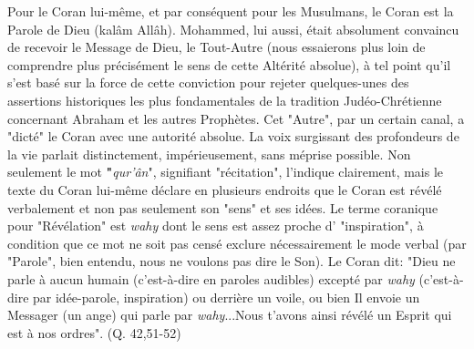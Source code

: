  
Pour le Coran lui-même, et par conséquent pour les Musulmans, le Coran
est la Parole de Dieu (kalâm Allâh). Mohammed, lui aussi, était
absolument convaincu de recevoir le Message de Dieu, le Tout-Autre (nous
essaierons plus loin de comprendre plus précisément le sens de cette
Altérité absolue), à tel point qu'il s'est basé sur la force de cette
conviction pour rejeter quelques-unes des assertions historiques les
plus fondamentales de la tradition Judéo-Chrétienne concernant Abraham
et les autres Prophètes. Cet "Autre", par un certain canal, a "dicté" le
Coran avec une autorité absolue. La voix surgissant des profondeurs de
la vie parlait distinctement, impérieusement, sans méprise possible. Non
seulement le mot \textbf{"}\emph{qur'ân}", signifiant "récitation",
l'indique clairement, mais le texte du Coran lui-même déclare en
plusieurs endroits que le Coran est révélé verbalement et non pas
seulement son "sens" et ses idées. Le terme coranique pour "Révélation"
est \emph{wahy} dont le sens est assez proche d' "inspiration", à
condition que ce mot ne soit pas censé exclure nécessairement le mode
verbal (par "Parole", bien entendu, nous ne voulons pas dire le Son). Le
Coran dit: "Dieu ne parle à aucun humain (c'est-à-dire en paroles
audibles) excepté par \emph{wahy} (c'est-à-dire par idée-parole,
inspiration) ou derrière un voile, ou bien Il envoie un Messager (un
ange) qui parle par \emph{wahy}...Nous t'avons ainsi révélé un Esprit
qui est à nos ordres". (Q. 42,51-52)

